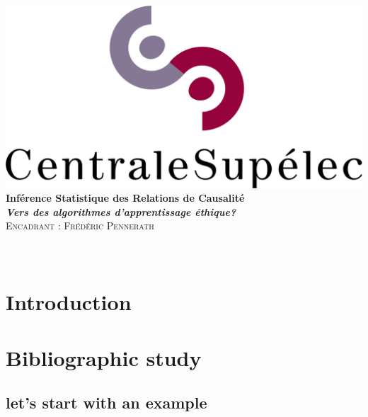 \documentclass{article}
\author{\Large \textsc{Mohammed FELLAJI, Ahmed BEN AISSA}}
\date{September, 2020}
\begin{document}
\hypersetup{pdfborder=0 0 0} 		%


\makeatletter
  \begin{titlepage}
  \centering
     {\large \textsc{   }}\\
     \vspace{1em}
    \centering
      \includegraphics[width=0.5 \textwidth]{figures/LogoCS.png} \\
    \vspace{4cm}
      {\LARGE\textbf{Inférence Statistique des Relations de Causalité}\\
       \vspace{1em}
       {\large\textbf{
       \textit{\LARGE{Vers des algorithmes d'apprentissage éthique?}}}}\\
    \vspace{4cm}
    \centering
     {\Large \textsc{Encadrant : Frédéric Pennerath}}\\
     \vspace{1em}
        {\Large \@author} \\
        \vspace{3em}
        {\Large \@date} }\\
  \end{titlepage}
 
 
\makeatother

\tableofcontents




\newpage
\section{Introduction}


\newpage
\section{Bibliographic study}

\subsection{let's start with an example}
\end{document}
